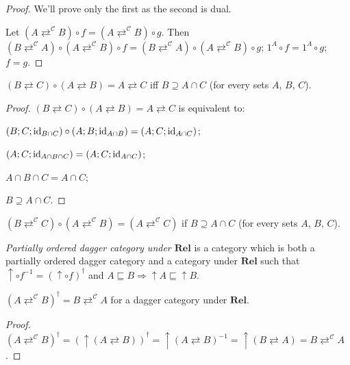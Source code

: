 \begin{proof}
  We'll prove only the first as the second is dual.
  
  Let $(A \rightleftarrows^{\mathcal{C}} B) \circ f = (A
  \rightleftarrows^{\mathcal{C}} B) \circ g$. Then $(B
  \rightleftarrows^{\mathcal{C}} A) \circ (A \rightleftarrows^{\mathcal{C}} B)
  \circ f = (B \rightleftarrows^{\mathcal{C}} A) \circ (A
  \rightleftarrows^{\mathcal{C}} B) \circ g$; $1^A \circ f = 1^A \circ g$; $f
  = g$.
\end{proof}

\begin{prop}
  $(B \rightleftarrows C) \circ (A \rightleftarrows B) = A \rightleftarrows C$
  iff $B \supseteq A \cap C$ (for every sets $A$, $B$, $C$).
\end{prop}

\begin{proof}
  $(B \rightleftarrows C) \circ (A \rightleftarrows B) = A \rightleftarrows C$
  is equivalent to:
  
  $(B ; C ; \operatorname{id}_{B \cap C}) \circ (A ; B ; \operatorname{id}_{A \cap B}) = (A ;
  C ; \operatorname{id}_{A \cap C})$;
  
  $(A ; C ; \operatorname{id}_{A \cap B \cap C}) = (A ; C ; \operatorname{id}_{A \cap C})$;
  
  $A \cap B \cap C = A \cap C$;
  
  $B \supseteq A \cap C$.
\end{proof}

\begin{cor}
  $(B \rightleftarrows^{\mathcal{C}} C) \circ (A
  \rightleftarrows^{\mathcal{C}} B) = (A \rightleftarrows^{\mathcal{C}} C)$ if
  $B \supseteq A \cap C$ (for every sets $A$, $B$, $C$).
\end{cor}

\begin{defn}
  \emph{Partially ordered dagger category under $\mathbf{Rel}$} is
  a category which is both a partially ordered dagger category and a category
  under $\mathbf{Rel}$ such that $\uparrow \circ f^{- 1} = (\uparrow
  \circ f)^{\dagger}$ and $A \sqsubseteq B \Rightarrow \uparrow A \sqsubseteq
  \uparrow B$.
\end{defn}

\begin{prop}
  $(A \rightleftarrows^{\mathcal{C}} B)^{\dagger} = B
  \rightleftarrows^{\mathcal{C}} A$ for a dagger category under
  $\mathbf{Rel}$.
\end{prop}

\begin{proof}
  $(A \rightleftarrows^{\mathcal{C}} B)^{\dagger} = (\uparrow (A
  \rightleftarrows B))^{\dagger} = \uparrow (A \rightleftarrows B)^{- 1} =
  \uparrow (B \rightleftarrows A) = B \rightleftarrows^{\mathcal{C}} A$.
\end{proof}

